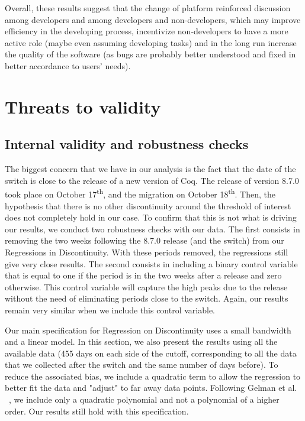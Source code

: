 \documentclass[conference]{IEEEtran}
\begin{document}
Overall, these results suggest that the change of platform reinforced discussion among developers and among developers and non-developers, which may improve efficiency in the developing process, incentivize non-developers to have a more active role (maybe even assuming developing tasks) and in the long run increase the quality of the software (as bugs are probably better understood and fixed in better accordance to users' needs). 

\section{Threats to validity}
\label{threats}
\subsection{Internal validity and robustness checks}

The biggest concern that we have in our analysis is the fact that the date of the switch is close to the release of a new version of Coq. The release of version 8.7.0 took place on October 17\textsuperscript{th}, and the migration on October 18\textsuperscript{th}. Then, the hypothesis that there is no other discontinuity around the threshold of interest does not completely hold in our case.
To confirm that this is not what is driving our results, we conduct two robustness checks with our data. The first consists in removing the two weeks following the 8.7.0 release (and the switch) from our Regressions in Discontinuity. With these periods removed, the regressions still give very close results. The second consists in including a binary control variable that is equal to one if the period is in the two weeks after a release and zero otherwise. This control variable will capture the high peaks due to the release without the need of eliminating periods close to the switch. Again, our results remain very similar when we include this control variable. 

Our main specification for Regression on Discontinuity uses a small bandwidth and a linear model. In this section, we also present the results using all the available data (455 days on each side of the cutoff, corresponding to all the data that we collected after the switch and the same number of days before). To reduce the associated bias, we include a quadratic term to allow the regression to better fit the data and "adjust" to far away data points. Following Gelman et al. ~\cite{gelman2018high}, we include only a quadratic polynomial and not a polynomial of a higher order. Our results still hold with this specification. 
\end{document}
